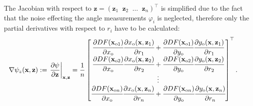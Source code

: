 The Jacobian with respect to $\mathbf{z} = (\mathbf{z}_1\;\;\mathbf{z}_2\;\; \dots \;\; \mathbf{z}_n)^{\top}$ is simplified due to the fact that the noise effecting the
angle measurements $\varphi_i$ is neglected, therefore only the partial derivatives with respect to $r_i$ have to
be calculated:
\begin{align}\label{eq:measmodel-jacobi-z}
    \nabla\psi_z(\mathbf{x},\mathbf{z}) := \left.\frac{\partial\psi}{\partial \mathbf{z}}\right\vert_{\mathbf{x},\mathbf{z}}
     & =
    \frac{1}{n}
    \begin{bmatrix}
        \cfrac{\partial DF(\mathbf{x}_{\text{o}1})}{\partial x_{\text{o}}}\cfrac{\partial x_{\text{o}}(\mathbf{x},\mathbf{z}_1)}{\partial r_1}
        + \cfrac{\partial DF(\mathbf{x}_{\text{o}1})}{\partial y_{\text{o}}}\cfrac{\partial y_{\text{o}}(\mathbf{x},\mathbf{z}_1)}{\partial r_1} \\
        \cfrac{\partial DF(\mathbf{x}_{\text{o}2})}{\partial x_{\text{o}}}\cfrac{\partial x_{\text{o}}(\mathbf{x},\mathbf{z}_2)}{\partial r_2}
        + \cfrac{\partial DF(\mathbf{x}_{\text{o}2})}{\partial y_{\text{o}}}\cfrac{\partial y_{\text{o}}(\mathbf{x},\mathbf{z}_2)}{\partial r_2} \\
        \vdots                                                                                                                                   \\
        \cfrac{\partial DF(\mathbf{x}_{\text{o}n})}{\partial x_{\text{o}}}\cfrac{\partial x_{\text{o}}(\mathbf{x},\mathbf{z}_n)}{\partial r_n}
        + \cfrac{\partial DF(\mathbf{x}_{\text{o}n})}{\partial y_{\text{o}}}\cfrac{\partial y_{\text{o}}(\mathbf{x},\mathbf{z}_n)}{\partial r_n} \\
    \end{bmatrix}^{\top}.
\end{align}